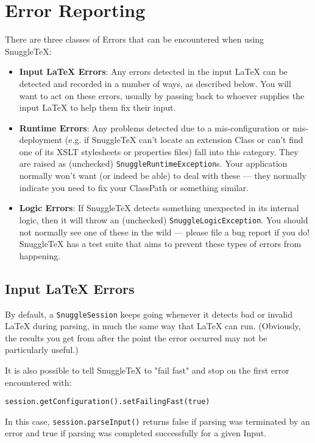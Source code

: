 
\section*{Error Reporting}

There are three classes of Errors that can be encountered when using SnuggleTeX:

\begin{itemize}

\item \textbf{Input LaTeX Errors}: Any errors detected in the input LaTeX can
  be detected and recorded in a number of ways, as described below. You will
  want to act on these errors, usually by passing back to whoever supplies
  the input LaTeX to help them fix their input.

\item \textbf{Runtime Errors}: Any problems detected due to a mis-configuration
  or mis-deployment (e.g. if SnuggleTeX can't locate an extension Class or can't
  find one of its XSLT stylesheets or properties files) fall into this category.
  They are raised as (unchecked) \verb|SnuggleRuntimeException|s. Your application
  normally won't want (or indeed be able) to deal with these --- they normally
  indicate you need to fix your ClassPath or something similar.

\item \textbf{Logic Errors}: If SnuggleTeX detects something unexpected in its
  internal logic, then it will throw an (unchecked) \verb|SnuggleLogicException|.
  You should not normally see one of these in the wild --- please file a bug report
  if you do! SnuggleTeX has a test suite that aims to prevent these types of errors
  from happening.
\end{itemize}

\subsection*{Input LaTeX Errors}

By default, a \verb|SnuggleSession| keeps going whenever it detects bad or
invalid LaTeX during parsing, in much the same way that LaTeX can run.
(Obviously, the results you get from after the point the error occurred
may not be particularly useful.)

It is also possible to tell SnuggleTeX to "fail fast" and stop on the first error
encountered with:
\begin{verbatim}session.getConfiguration().setFailingFast(true)\end{verbatim}
In this case, \verb|session.parseInput()| returns false if parsing was
terminated by an error and true if parsing was completed successfully for
a given Input.

